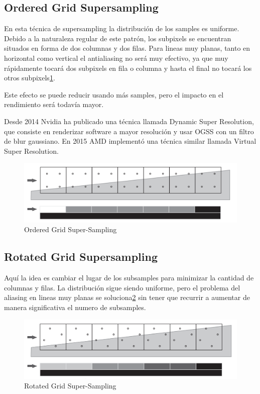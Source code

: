 \documentclass[withindex, glossary]{cam-thesis}
\begin{document}

\subsection{Ordered Grid Supersampling}

En esta técnica de supersampling la distribución de los samples es uniforme. Debido a la naturaleza regular de este patrón, los subpixels se encuentran situados en forma de dos columnas y dos filas. Para lineas muy planas, tanto en horizontal como vertical el antialiasing no será muy efectivo, ya que muy rápidamente tocará dos subpixels en fila o columna y hasta el final no tocará los otros subpixels\ref{ogss}.

Este efecto se puede reducir usando más samples, pero el impacto en el rendimiento será todavía mayor.

Desde 2014 Nvidia ha publicado una técnica llamada Dynamic Super Resolution\cite{960}, que consiste en renderizar software a mayor resolución y usar OGSS con un filtro de blur gaussiano. En 2015 AMD implementó una técnica similar llamada Virtual Super Resolution.

\begin{figure}[!htb]
    \includegraphics[width=\linewidth]{figures/ogss.png}
    \caption{Ordered Grid Super-Sampling\cite{Beets2000SupersamplingAA}}
    \label{ogss}
\end{figure}

\subsection{Rotated Grid Supersampling}

Aquí la idea es cambiar el lugar de los subsamples para minimizar la cantidad de columnas y filas. La distribución sigue siendo uniforme, pero el problema del aliasing en lineas muy planas se soluciona\ref{rgss} sin tener que recurrir a aumentar de manera significativa el numero de subsamples.

\begin{figure}[!htb]
    \includegraphics[width=\linewidth]{figures/rgss.png}
    \caption{Rotated Grid Super-Sampling\cite{Beets2000SupersamplingAA}}
    \label{rgss}
\end{figure}
\end{document}
